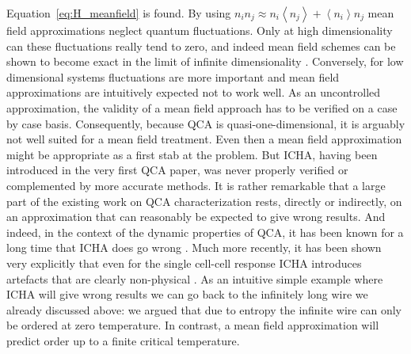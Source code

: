 Equation~\eqref{eq:H_meanfield} is found. By using $n_i n_j \approx n_i \left<
n_j \right> + \left< n_i \right> n_j$ mean field approximations neglect quantum
fluctuations. Only at high dimensionality can these fluctuations really tend to
zero, and indeed mean field schemes can be shown to become exact in the limit of
infinite dimensionality \cite{Fehske}. Conversely, for low dimensional systems
fluctuations are more important and mean field approximations are intuitively
expected not to work well. As an uncontrolled approximation, the validity of a
mean field approach has to be verified on a case by case basis.  Consequently,
because QCA is quasi-one-dimensional, it is arguably not well suited for a mean
field treatment. Even then a mean field approximation might be appropriate as a
first stab at the problem. But ICHA, having been introduced in the very first
QCA paper, was never properly verified or complemented by more accurate methods.
It is rather remarkable that a large part of the existing work on QCA
characterization rests, directly or indirectly, on an approximation that can
reasonably be expected to give wrong results. And indeed, in the context of the
dynamic properties of QCA, it has been known for a long time that ICHA does go
wrong \cite{toth2001role}. Much more recently, it has been shown very explicitly
that even for the single cell-cell response ICHA introduces artefacts that are
clearly non-physical \cite{taucer2012consequences}. As an intuitive simple
example where ICHA will give wrong results we can go back to the infinitely long
wire we already discussed above: we argued that due to entropy the infinite wire
can only be ordered at zero temperature. In contrast, a mean field approximation
will predict order up to a finite critical temperature. 

